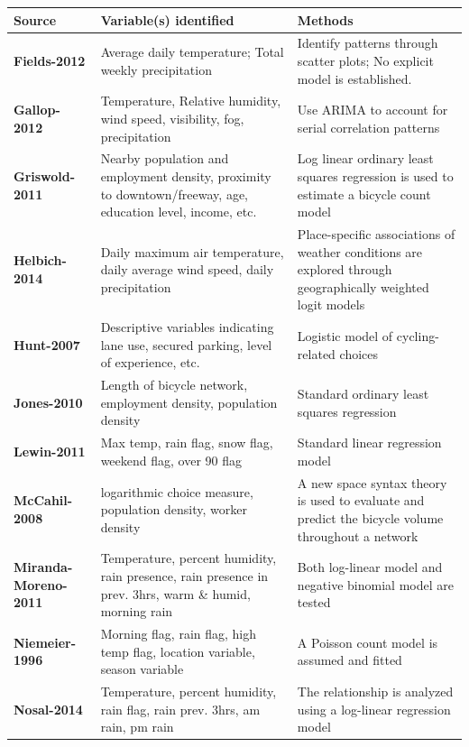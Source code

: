 \documentclass [11pt, proquest] {uwthesis}[2015/03/03]
\begin{document}
\begin{center}
\begin{scriptsize}
 \begin{tabular}{p{3cm} p{7cm} p{5cm}} 
 \hline
 Source & Variable(s) identified & Methods \\ [0.5ex] 
 \hline\hline
\textbf{Fields-2012} & Average daily temperature; Total weekly precipitation & Identify patterns through scatter plots; No explicit model is established. \\
  \textbf{Gallop-2012} & Temperature, Relative humidity, wind speed, visibility, fog, precipitation & Use ARIMA to account for serial correlation patterns \\
  \textbf{Griswold-2011} & Nearby population and employment density, proximity to downtown/freeway, age, education level, income, etc. & Log linear ordinary least squares regression is used to estimate a bicycle count model \\
  \textbf{Helbich-2014} & Daily maximum air temperature, daily average wind speed, daily precipitation & Place-specific associations of weather conditions are explored through geographically weighted logit models \\
  \textbf{Hunt-2007} & Descriptive variables indicating lane use, secured parking, level of experience, etc. & Logistic model of cycling-related choices \\
  \textbf{Jones-2010} & Length of bicycle network, employment density, population density & Standard ordinary least squares regression \\
  \textbf{Lewin-2011} & Max temp, rain flag, snow flag, weekend flag, over 90 flag & Standard linear regression model \\
  \textbf{McCahil-2008} & logarithmic choice measure, population density, worker density & A new space syntax theory is used to evaluate and predict the bicycle volume throughout a network \\
  \textbf{Miranda-Moreno-2011} & Temperature, percent humidity, rain presence, rain presence in prev. 3hrs, warm \& humid, morning rain & Both log-linear model and negative binomial model are tested \\
  \textbf{Niemeier-1996} & Morning flag, rain flag, high temp flag, location variable, season variable & A Poisson count model is assumed and fitted \\
  \textbf{Nosal-2014} & Temperature, percent humidity, rain flag, rain prev. 3hrs, am rain, pm rain & The relationship is analyzed using a log-linear regression model \\

\end{tabular}
\end{scriptsize}
\end{center}
\end{document}
